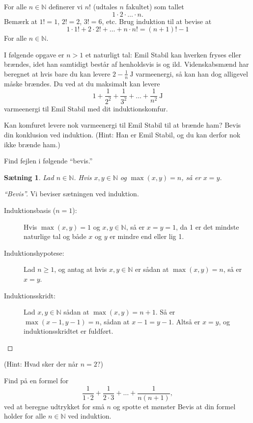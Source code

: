 \documentclass[a4paper,12pt]{article}
\theoremstyle{plain}
\newtheorem{saetning}{Sætning}[section]
\newcommand{\N}{\mathbb{N}}
\begin{document}
\begin{Exercise}
For alle \(n\in\N\) definerer vi \(n!\) (udtales \(n\) fakultet) som tallet
\[
    1\cdot 2\cdot\dots\cdot n.
\]
Bemærk at \(1!=1\), \(2!=2\), \(3!=6\), etc. Brug induktion til at bevise at
\[
    1\cdot 1!+2\cdot 2!+\dots+n\cdot n!=(n+1)!-1
\]
For alle \(n\in\N\).
\end{Exercise}
\begin{Exercise}
  I følgende opgave er \(n>1\) et naturligt tal: Emil Stabil kan hverken fryses eller brændes, idet han samtidigt består af henholdsvis is og ild. Videnskabsmænd har beregnet at hvis bare du kan levere \( 2-\frac{1}{n}\ \mathrm{J}\) varmeenergi, så kan han dog alligevel måske brændes. Du ved at du maksimalt kan levere
  \[
    1+\frac{1}{2^2}+\frac{1}{3^2}+\dots+\frac{1}{n^2}\ \mathrm{J}
  \]
  varmeenergi til Emil Stabil med dit induktionskomfur.

  Kan komfuret levere nok varmeenergi til Emil Stabil til at brænde ham? Bevis din konklusion ved induktion. (Hint: Han er Emil Stabil, og du kan derfor nok ikke brænde ham.) 
\end{Exercise}
\begin{Exercise}
  Find fejlen i følgende ``bevis.'' 
\begin{saetning}
  Lad \(n\in\N\). Hvis \(x,y\in\N\) og \(\max(x,y)=n\), så er \(x=y\).
\end{saetning}
\begin{proof}[``Bevis'']
  Vi beviser sætningen ved induktion.
  \begin{description}
    \item[Induktionsbasis (\(n=1\)):] Hvis \(\max(x,y)=1\) og \(x,y\in\N\), så er \(x=y=1\), da 1 er det mindste naturlige tal og både \(x\) og \(y\) er mindre end eller lig 1.
    \item[Induktionshypotese:] Lad \(n\ge 1\), og antag at hvis \(x,y\in\N\) er sådan at \(\max(x,y)=n\), så er \(x=y\).
    \item[Induktionsskridt:] Lad \(x,y\in\N\) sådan at \(\max(x,y)=n+1\). Så er \(\max(x-1,y-1)=n\), sådan at \(x-1=y-1\). Altså er \(x=y\), og induktionsskridtet er fuldført.
  \end{description}
\end{proof}
 (Hint: Hvad sker der når \(n=2\)?)
\end{Exercise}
\begin{Exercise}[label={ex:6}]
  \Question Find på en formel for
  \[
    \frac{1}{1\cdot 2}+\frac{1}{2\cdot 3}+\dots+\frac{1}{n(n+1)},
  \]
  ved at beregne udtrykket for små \(n\) og spotte et mønster
  \Question Bevis at din formel holder for alle \(n\in\N\) ved induktion.
\end{Exercise}
\end{document}

